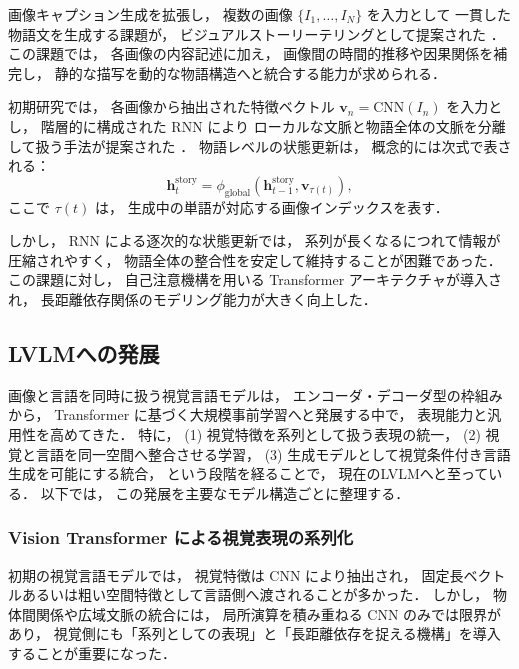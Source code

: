 \documentclass[a4j,12pt,dvipdfmx]{jsreport}
\begin{document}
画像キャプション生成を拡張し，
複数の画像 $\{I_1,\ldots,I_N\}$ を入力として
一貫した物語文を生成する課題が，
ビジュアルストーリーテリングとして提案された
\cite{huang-etal-2016-visual}．
この課題では，
各画像の内容記述に加え，
画像間の時間的推移や因果関係を補完し，
静的な描写を動的な物語構造へと統合する能力が求められる．

初期研究では，
各画像から抽出された特徴ベクトル
$\mathbf{v}_n = \mathrm{CNN}(I_n)$
を入力とし，
階層的に構成された RNN により
ローカルな文脈と物語全体の文脈を分離して扱う手法が提案された
\cite{yu_hierarchically-attentive_2017,nahian_hierarchical_2019}．
物語レベルの状態更新は，
概念的には次式で表される：
\begin{equation}
   \mathbf{h}_t^{\text{story}}
   =
   \phi_{\text{global}}
   (\mathbf{h}_{t-1}^{\text{story}}, \mathbf{v}_{\tau(t)}),
\end{equation}
ここで $\tau(t)$ は，
生成中の単語が対応する画像インデックスを表す．

しかし，
RNN による逐次的な状態更新では，
系列が長くなるにつれて情報が圧縮されやすく，
物語全体の整合性を安定して維持することが困難であった．
この課題に対し，
自己注意機構を用いる Transformer アーキテクチャが導入され，
長距離依存関係のモデリング能力が大きく向上した．

\subsection{LVLMへの発展}
\label{sec:lvlm_evolution}

画像と言語を同時に扱う視覚言語モデルは，
エンコーダ・デコーダ型の枠組みから，
Transformer に基づく大規模事前学習へと発展する中で，
表現能力と汎用性を高めてきた．
特に，
(1) 視覚特徴を系列として扱う表現の統一，
(2) 視覚と言語を同一空間へ整合させる学習，
(3) 生成モデルとして視覚条件付き言語生成を可能にする統合，
という段階を経ることで，
現在のLVLMへと至っている．
以下では，
この発展を主要なモデル構造ごとに整理する．

\subsubsection{Vision Transformer による視覚表現の系列化}

初期の視覚言語モデルでは，
視覚特徴は CNN により抽出され，
固定長ベクトルあるいは粗い空間特徴として言語側へ渡されることが多かった．
しかし，
物体間関係や広域文脈の統合には，
局所演算を積み重ねる CNN のみでは限界があり，
視覚側にも「系列としての表現」と「長距離依存を捉える機構」を導入することが重要になった．
\end{document}
